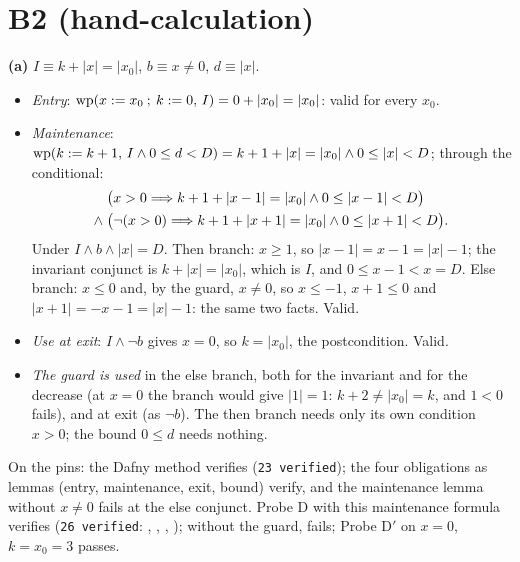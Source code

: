 \documentclass[11pt]{article}
\begin{document}
\section*{B2 (hand-calculation)}

\textbf{(a)} $I \equiv k + \lvert x\rvert = \lvert x_0\rvert$, $b \equiv x \neq
0$, $d \equiv \lvert x\rvert$.
\begin{itemize}
\item \emph{Entry}: $\mathrm{wp}(x \mathrel{:=} x_0 \mathbin{;}\, k \mathrel{:=} 0,\,I) = 0 + \lvert
  x_0\rvert = \lvert x_0\rvert$: valid for every $x_0$.
\item \emph{Maintenance}: $\mathrm{wp}(k \mathrel{:=} k + 1,\,I \wedge 0 \leq d < D) = k + 1
  + \lvert x\rvert = \lvert x_0\rvert \wedge 0 \leq \lvert x\rvert < D$; through
  the conditional:
  \[ \begin{aligned} & \bigl(x > 0 \Longrightarrow k + 1 + \lvert x - 1\rvert = \lvert
  x_0\rvert \wedge 0 \leq \lvert x - 1\rvert < D\bigr) \\ \wedge\; &
  \bigl(\neg(x > 0) \Longrightarrow k + 1 + \lvert x + 1\rvert = \lvert x_0\rvert \wedge 0
  \leq \lvert x + 1\rvert < D\bigr). \end{aligned} \]
  Under $I \wedge b \wedge \lvert x\rvert = D$. Then branch: $x \geq 1$, so
  $\lvert x - 1\rvert = x - 1 = \lvert x\rvert - 1$; the invariant conjunct is
  $k + \lvert x\rvert = \lvert x_0\rvert$, which is $I$, and $0 \leq x - 1 < x =
  D$. Else branch: $x \leq 0$ and, by the guard, $x \neq 0$, so $x \leq -1$,
  $x + 1 \leq 0$ and $\lvert x + 1\rvert = -x - 1 = \lvert x\rvert - 1$: the same
  two facts. Valid.
\item \emph{Use at exit}: $I \wedge \neg b$ gives $x = 0$, so $k = \lvert
  x_0\rvert$, the postcondition. Valid.
\item \emph{The guard is used} in the else branch, both for the invariant and
  for the decrease (at $x = 0$ the branch would give $\lvert 1\rvert = 1$:
  $k + 2 \neq \lvert x_0\rvert = k$, and $1 < 0$ fails), and at exit (as
  $\neg b$). The then branch needs only its own condition $x > 0$; the bound
  $0 \leq d$ needs nothing.
\end{itemize}
On the pins: the Dafny method verifies (\texttt{23 verified}); the four
obligations as lemmas (entry, maintenance, exit, bound) verify, and the
maintenance lemma without $x \neq 0$ fails at the else conjunct. Probe D
with this maintenance formula verifies (\texttt{26 verified}: ,
, , ); without the guard,
 fails; Probe D$'$ on $x = 0$, $k = x_0 = 3$ passes.
\end{document}
